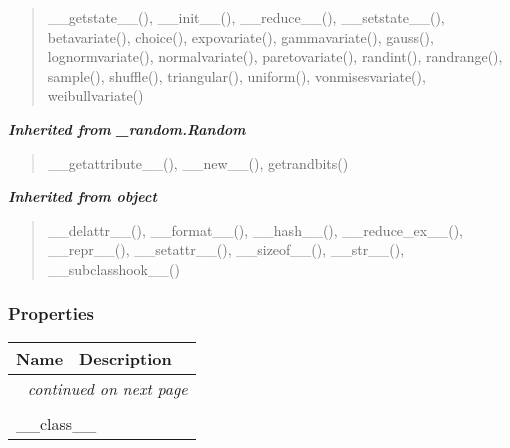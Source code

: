 \begin{quote}
\_\_getstate\_\_(), \_\_init\_\_(), \_\_reduce\_\_(), \_\_setstate\_\_(), betavariate(), choice(), expovariate(), gammavariate(), gauss(), lognormvariate(), normalvariate(), paretovariate(), randint(), randrange(), sample(), shuffle(), triangular(), uniform(), vonmisesvariate(), weibullvariate()
\end{quote}

\large{\textbf{\textit{Inherited from \_random.Random}}}

\begin{quote}
\_\_getattribute\_\_(), \_\_new\_\_(), getrandbits()
\end{quote}

\large{\textbf{\textit{Inherited from object}}}

\begin{quote}
\_\_delattr\_\_(), \_\_format\_\_(), \_\_hash\_\_(), \_\_reduce\_ex\_\_(), \_\_repr\_\_(), \_\_setattr\_\_(), \_\_sizeof\_\_(), \_\_str\_\_(), \_\_subclasshook\_\_()
\end{quote}


  \subsubsection{Properties}

    \vspace{-1cm}
\hspace{\varindent}\begin{longtable}{|p{\varnamewidth}|p{\vardescrwidth}|l}
\cline{1-2}
\cline{1-2} \centering \textbf{Name} & \centering \textbf{Description}& \\
\cline{1-2}
\endhead\cline{1-2}\multicolumn{3}{r}{\small\textit{continued on next page}}\\\endfoot\cline{1-2}
\endlastfoot\multicolumn{2}{|l|}{\textit{Inherited from object}}\\
\multicolumn{2}{|p{\varwidth}|}{\raggedright \_\_class\_\_}\\
\cline{1-2}
\end{longtable}



